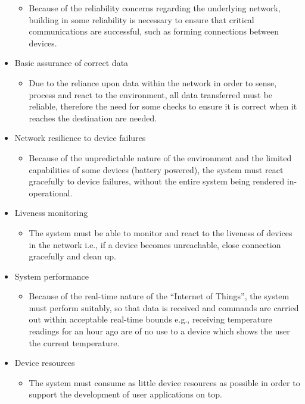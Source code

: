 \begin{itemize}
	\begin{itemize}
		\item Because of the reliability concerns regarding the underlying network, building in some reliability is necessary to ensure that critical communications are successful, such as forming connections between devices. 
	\end{itemize}
	\item Basic assurance of correct data
	\begin{itemize}
			\item Due to the reliance upon data within the network in order to sense, process and react to the environment, all data transferred must be reliable, therefore the need for some checks to ensure it is correct when it reaches the destination are needed. 
	\end{itemize}
	\item Network resilience to device failures
	\begin{itemize}
		\item Because of the unpredictable nature of the environment and the limited capabilities of some devices (battery powered), the system must react gracefully to device failures, without the entire system being rendered in-operational.
	\end{itemize}
	\item Liveness monitoring
	\begin{itemize}
		\item The system must be able to monitor and react to the liveness of devices in the network i.e., if a device becomes unreachable, close connection gracefully and clean up.
	\end{itemize}
	\item System performance
	\begin{itemize}
		\item Because of the real-time nature of the ``Internet of Things'', the system must perform suitably, so that data is received and commands are carried out within acceptable real-time bounds e.g., receiving temperature readings for an hour ago are of no use to a device which shows the user the current temperature.
	\end{itemize}
	\item Device resources
	\begin{itemize}
		\item The system must consume as little device resources as possible in order to support the development of user applications on top.
	\end{itemize}
\end{itemize}

